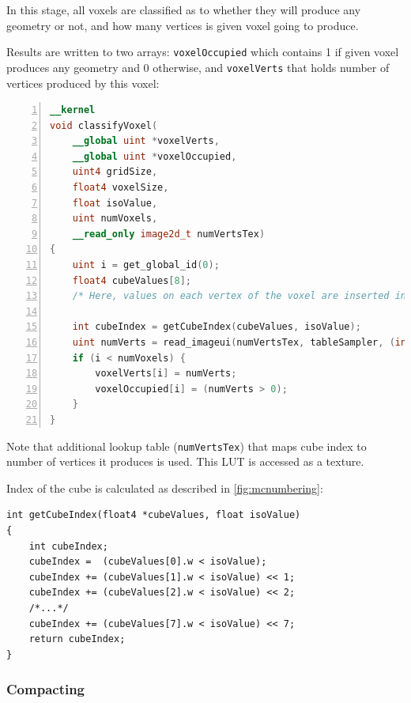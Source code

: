 In this stage, all voxels are classified as to whether they will produce any
geometry or not, and how many vertices is given voxel going to produce.

Results are written to two arrays: \texttt{voxelOccupied} which contains 1
if given voxel produces any geometry and 0 otherwise, and
\texttt{voxelVerts} that holds number of vertices produced by this voxel:
\begin{lstlisting}[language=opencl, numbers=left]
__kernel
void classifyVoxel(
	__global uint *voxelVerts,
	__global uint *voxelOccupied,
	uint4 gridSize,
	float4 voxelSize,
	float isoValue,
	uint numVoxels,
	__read_only image2d_t numVertsTex)
{
	uint i = get_global_id(0);
	float4 cubeValues[8];
	/* Here, values on each vertex of the voxel are inserted into cubeValues array */

	int cubeIndex = getCubeIndex(cubeValues, isoValue);
	uint numVerts = read_imageui(numVertsTex, tableSampler, (int2)(cubeIndex, 0)).x;
	if (i < numVoxels) {
		voxelVerts[i] = numVerts;
		voxelOccupied[i] = (numVerts > 0);
	}
}
\end{lstlisting}
Note that additional lookup table (\texttt{numVertsTex}) that maps cube index to
number of vertices it produces is used. This LUT is accessed as a texture.

Index of the cube is calculated as described in \autoref{fig:mcnumbering}:

\begin{lstlisting}
int getCubeIndex(float4 *cubeValues, float isoValue)
{
	int cubeIndex;
	cubeIndex =  (cubeValues[0].w < isoValue);
	cubeIndex += (cubeValues[1].w < isoValue) << 1;
	cubeIndex += (cubeValues[2].w < isoValue) << 2;
	/*...*/
	cubeIndex += (cubeValues[7].w < isoValue) << 7;
	return cubeIndex;
}
\end{lstlisting}

\subsubsection{Compacting}

